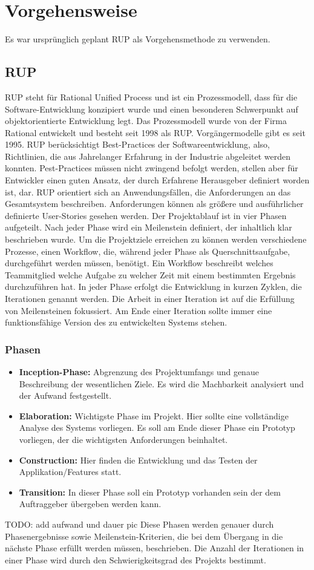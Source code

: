\chapter{Vorgehensweise}
\reiter
Es war ursprünglich geplant RUP als Vorgehensmethode zu verwenden. 
\section{RUP}
RUP steht für Rational Unified Process und ist ein Prozessmodell, dass für die Software-Entwicklung konzipiert wurde und einen besonderen Schwerpunkt auf objektorientierte Entwicklung legt. Das Prozessmodell wurde von der Firma Rational entwickelt und besteht seit 1998 als RUP. Vorgängermodelle gibt es seit 1995. 
RUP berücksichtigt Best-Practices der Softwareentwicklung, also, Richtlinien, die aus Jahrelanger Erfahrung in der Industrie abgeleitet werden konnten. Pest-Practices müssen nicht zwingend befolgt werden, stellen aber für Entwickler einen guten Ansatz, der durch Erfahrene Herausgeber definiert worden ist, dar. 
RUP orientiert sich an Anwendungsfällen, die Anforderungen an das Gesamtsystem beschreiben. Anforderungen können als größere und ausführlicher definierte User-Stories gesehen werden.  
Der Projektablauf ist in vier Phasen aufgeteilt. Nach jeder Phase wird ein Meilenstein definiert, der inhaltlich klar beschrieben wurde.
Um die Projektziele erreichen zu können werden verschiedene Prozesse, einen Workflow, die, während jeder Phase als Querschnittsaufgabe, durchgeführt werden müssen, benötigt. Ein Workflow beschreibt welches Teammitglied welche Aufgabe zu welcher Zeit mit einem bestimmten Ergebnis durchzuführen hat.
In jeder Phase erfolgt die Entwicklung in kurzen Zyklen, die Iterationen genannt werden. Die Arbeit in einer Iteration ist auf die Erfüllung von Meilensteinen fokussiert. Am Ende einer Iteration sollte immer eine funktionsfähige Version des zu entwickelten Systems stehen. 
\subsection{Phasen}
\begin{itemize}
	\item \textbf{Inception-Phase:} Abgrenzung des Projektumfangs und genaue Beschreibung der wesentlichen Ziele. Es wird die Machbarkeit analysiert und der Aufwand festgestellt.
	\item \textbf{Elaboration:} Wichtigste Phase im Projekt. Hier sollte eine vollständige Analyse des Systems vorliegen. Es soll am Ende dieser Phase ein Prototyp vorliegen, der die wichtigsten Anforderungen beinhaltet.
	\item \textbf{Construction:} Hier finden die Entwicklung und das Testen der Applikation/Features statt.
	\item \textbf{Transition:} In dieser Phase soll ein Prototyp vorhanden sein der dem Auftraggeber übergeben werden kann. 
\end{itemize}
TODO: add aufwand und dauer pic
Diese Phasen werden genauer durch Phasenergebnisse sowie Meilenstein-Kriterien, die bei dem Übergang in die nächste Phase erfüllt werden müssen, beschrieben.
Die Anzahl der Iterationen in einer Phase wird durch den Schwierigkeitsgrad des Projekts bestimmt. 
